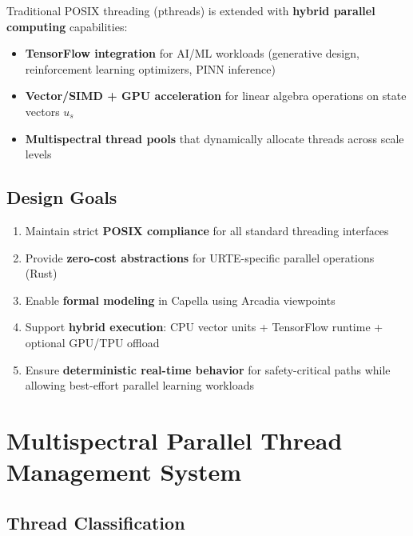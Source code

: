 \documentclass[11pt,a4paper]{report}
\begin{document}
Traditional POSIX threading (pthreads) is extended with \textbf{hybrid parallel computing} capabilities:
\begin{itemize}
    \item \textbf{TensorFlow integration} for AI/ML workloads (generative design, reinforcement learning optimizers, PINN inference)
    \item \textbf{Vector/SIMD + GPU acceleration} for linear algebra operations on state vectors $u_s$
    \item \textbf{Multispectral thread pools} that dynamically allocate threads across scale levels
\end{itemize}

\section{Design Goals}

\begin{enumerate}
    \item Maintain strict \textbf{POSIX compliance} for all standard threading interfaces
    \item Provide \textbf{zero-cost abstractions} for URTE-specific parallel operations (Rust)
    \item Enable \textbf{formal modeling} in Capella using Arcadia viewpoints
    \item Support \textbf{hybrid execution}: CPU vector units + TensorFlow runtime + optional GPU/TPU offload
    \item Ensure \textbf{deterministic real-time behavior} for safety-critical paths while allowing best-effort parallel learning workloads
\end{enumerate}

\chapter{Multispectral Parallel Thread Management System}

\section{Thread Classification}
\end{document}
